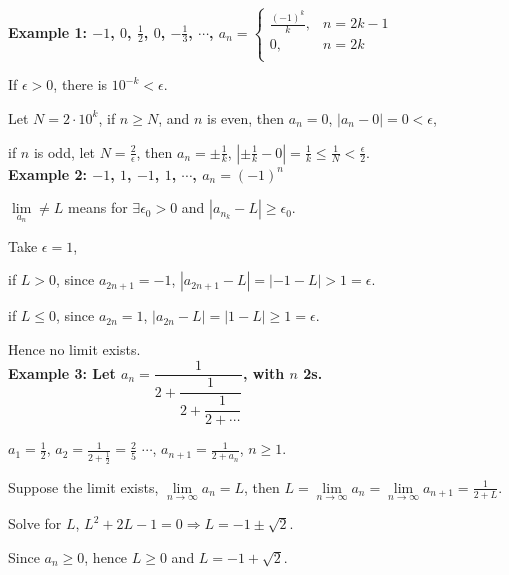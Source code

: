 \documentclass[12pt]{article}
\newcommand{\abs}[1]{\left| #1 \right|}
\theoremstyle{plain}
\newcommand{\dlim}{\displaystyle\lim\limits}
\begin{document}
    {\color{Brown}
    \textbf{Example 1:
        $-1$, $0$, $\frac12$, $0$, $-\frac13$, $\cdots$, 
        $   
            a_n=
            \begin{cases}
                \frac{(-1)^k}k, & n = 2k-1\\
                0,   &n = 2k \\
                \end{cases}
        $}

        If $\epsilon > 0$, 
        there is $10^{-k} < \epsilon$.

        Let $N = 2\cdot 10^k$, 
        if $n\geq N$, and $n$ is even, then $a_n = 0$, 
        $\abs{a_n - 0} = 0<\epsilon$, 
        
        if $n$ is odd, let $N = \frac 2{\epsilon}$, 
        then $a_n = \pm \frac1{k}$, 
        $\abs{\pm\frac1k - 0} = \frac1k \leq \frac1N<\frac{\epsilon}2$.\\

    \textbf{Example 2: $-1$, $1$,  $-1$, $1$, $\cdots$, $a_n = (-1)^n$}

        $\dlim_{a_n} \neq L$ means for $\exists \epsilon_0 > 0$
        and $\abs{a_{n_k}-L}\geq \epsilon_0$.

        Take $\epsilon =1$,

        if $L > 0$, since $a_{2n+1} = -1$, 
        $\abs{a_{2n+1} -L} = \abs{-1-L} > 1=\epsilon$.
        
        if $L \leq 0$, since $a_{2n} = 1$,
        $\abs{a_{2n} -L} = \abs{1-L} \geq 1=\epsilon$.
                
        Hence no limit exists.\\
        
    \textbf{Example 3: Let $a_n = \dfrac1{2+\dfrac1{2+\dfrac1{2+\cdots}}}$, with $n$ 2s. }
        
        $a_1 = \frac12$, $a_2 = \frac1{2+\frac12}=\frac25$ $\cdots$, 
        $a_{n+1} = \frac1{2+a_n}$, $n\geq1$.

        Suppose the limit exists, $\dlim_{n\to\infty} a_n = L$, 
        then $L = \dlim_{n\to\infty} a_n = \dlim_{n\to\infty} a_{n+1}
        = \frac1{2+L}$.

        Solve for $L$, $L^2+2L-1 = 0 \Rightarrow L = -1\pm\sqrt2$.

        Since $a_n\geq0$, hence $L\geq 0$ and $L= -1+\sqrt 2$.}
        
\end{document}
